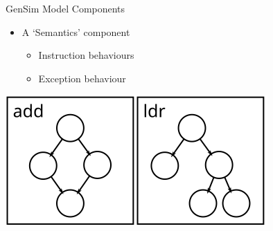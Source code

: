 \begin{frame}{GenSim Model Components}
\smallskip
\pause

\begin{minipage}[h]{0.6\textwidth}
\begin{itemize}
\item A `Semantics' component
\begin{itemize}
\item Instruction behaviours
\item Exception behaviour
\end{itemize}
\end{itemize}
\end{minipage}%
\begin{minipage}[h]{0.35\textwidth}
\centering
\includegraphics[width=\textwidth]{figures/component-semantics}
\end{minipage}

\end{frame}

